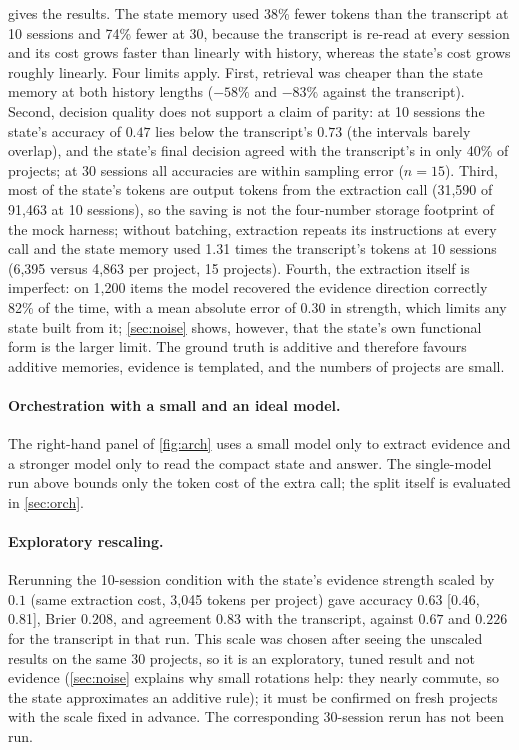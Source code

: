 \documentclass[11pt]{article}
\theoremstyle{definition}
\theoremstyle{remark}
\begin{document}
 gives the results. The state memory used 38\% fewer tokens than the transcript at 10 sessions and 74\% fewer at 30, because the transcript is re-read at every session and its cost grows faster than linearly with history, whereas the state's cost grows roughly linearly. Four limits apply. First, retrieval was cheaper than the state memory at both history lengths ($-58\%$ and $-83\%$ against the transcript). Second, decision quality does not support a claim of parity: at 10 sessions the state's accuracy of $0.47$ lies below the transcript's $0.73$ (the intervals barely overlap), and the state's final decision agreed with the transcript's in only 40\% of projects; at 30 sessions all accuracies are within sampling error ($n=15$). Third, most of the state's tokens are output tokens from the extraction call (31{,}590 of 91{,}463 at 10 sessions), so the saving is not the four-number storage footprint of the mock harness; without batching, extraction repeats its instructions at every call and the state memory used 1.31 times the transcript's tokens at 10 sessions (6{,}395 versus 4{,}863 per project, 15 projects). Fourth, the extraction itself is imperfect: on 1{,}200 items the model recovered the evidence direction correctly 82\% of the time, with a mean absolute error of 0.30 in strength, which limits any state built from it; \cref{sec:noise} shows, however, that the state's own functional form is the larger limit. The ground truth is additive and therefore favours additive memories, evidence is templated, and the numbers of projects are small.

\paragraph{Orchestration with a small and an ideal model.} The right-hand panel of \cref{fig:arch} uses a small model only to extract evidence and a stronger model only to read the compact state and answer. The single-model run above bounds only the token cost of the extra call; the split itself is evaluated in \cref{sec:orch}.

\paragraph{Exploratory rescaling.} Rerunning the 10-session condition with the state's evidence strength scaled by $0.1$ (same extraction cost, 3{,}045 tokens per project) gave accuracy $0.63$ [0.46, 0.81], Brier $0.208$, and agreement $0.83$ with the transcript, against $0.67$ and $0.226$ for the transcript in that run. This scale was chosen after seeing the unscaled results on the same 30 projects, so it is an exploratory, tuned result and not evidence (\cref{sec:noise} explains why small rotations help: they nearly commute, so the state approximates an additive rule); it must be confirmed on fresh projects with the scale fixed in advance. The corresponding 30-session rerun has not been run.
\end{document}
